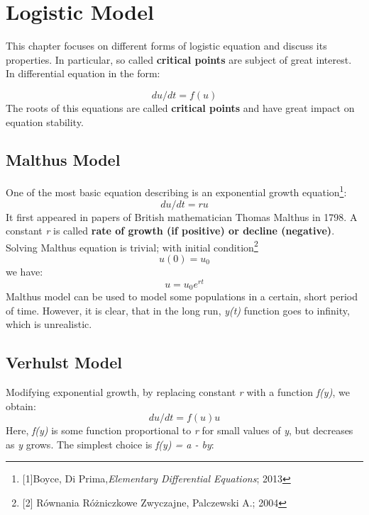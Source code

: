 \chapter{Logistic Model}
This chapter focuses on different forms of logistic equation and discuss its properties. In particular, so called \textbf{critical points} are subject of great interest.
In differential equation in the form:

\begin{equation}\label{eq: general form}
du/dt = f(u)
\end{equation}
The roots of this equations are called \textbf{critical points} and have great impact on equation stability.
\section{Malthus Model}
One of the most basic equation describing is an exponential growth equation\footnote{[1]Boyce, Di Prima,\textit{Elementary Differential Equations}; 2013}:
\begin{equation} 
 du/dt = ru
\end{equation}
It first appeared in papers of British mathematician Thomas Malthus in 1798. A constant \textit{r} is called \textbf{rate of growth (if positive) or decline (negative)}. Solving Malthus equation is trivial; with initial condition\footnote{[2] Równania Różniczkowe Zwyczajne, Palczewski A.; 2004}
\begin{equation}
u(0) = u_0
\end{equation}
we have:
\begin{equation}
u = u_0 e^{rt}
\end{equation}
Malthus model can be used to model some populations in a certain, short period of time. However, it is clear, that in the long run, \textit{y(t)} function goes to infinity, which is unrealistic.

\section{Verhulst Model}
Modifying exponential growth, by replacing constant \textit{r} with a function \textit{f(y)}, we obtain:
\begin{equation}
du/dt = f(u)u
\end{equation}
Here, \textit{f(y)} is some function proportional to \textit{r} for small values of \textit{y}, but decreases as \textit{y} grows. The simplest choice is \textit{f(y) = a - by}:

